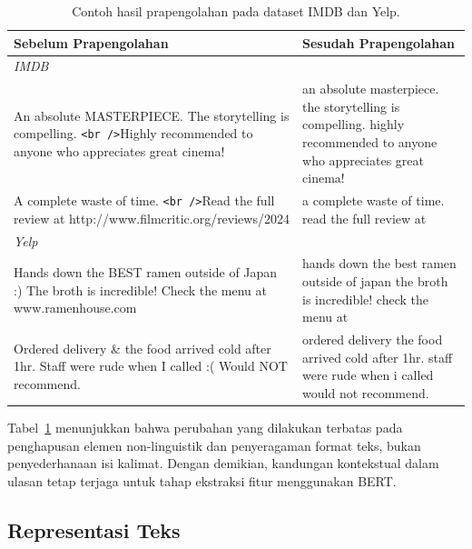 \begin{table}[H]
    \centering
    \caption{Contoh hasil prapengolahan pada dataset IMDB dan Yelp.}
    \label{tab:preprocessing}
    \begin{tabular}{p{} p{}}
        \hline
        \textbf{Sebelum Prapengolahan} & \textbf{Sesudah Prapengolahan} \\
        \hline
        \multicolumn{2}{l}{\textit{IMDB}} \\
        \hline
        An absolute MASTERPIECE. The storytelling is compelling.
        \texttt{<br />}Highly recommended to anyone who
        appreciates great cinema! &
        an absolute masterpiece. the storytelling is compelling.
        highly recommended to anyone who appreciates great cinema! \\
        \hline
        A complete waste of time. \texttt{<br />}Read the full
        review at http://www.filmcritic.org/reviews/2024 &
        a complete waste of time. read the full review at \\
        \hline
        \multicolumn{2}{l}{\textit{Yelp}} \\
        \hline
        Hands down the BEST ramen outside of Japan :) The broth
        is incredible! Check the menu at www.ramenhouse.com &
        hands down the best ramen outside of japan the broth
        is incredible! check the menu at \\
        \hline
        Ordered delivery \& the food arrived cold after 1hr.
        Staff were rude when I called :( Would NOT recommend. &
        ordered delivery the food arrived cold after 1hr.
        staff were rude when i called would not recommend. \\
        \hline
    \end{tabular}
\end{table}

Tabel~\ref{tab:preprocessing} menunjukkan bahwa perubahan yang dilakukan
terbatas pada penghapusan elemen non-linguistik dan penyeragaman format
teks, bukan penyederhanaan isi kalimat. Dengan demikian, kandungan
kontekstual dalam ulasan tetap terjaga untuk tahap ekstraksi fitur
menggunakan BERT.

\subsection{Representasi Teks}

